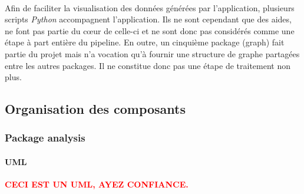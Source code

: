 \documentclass{scrartcl}
\begin{document}
    \paragraph{}Afin de faciliter la visualisation des données générées par l'application, plusieurs scripts \textit{Python} accompagnent l'application. Ils ne sont cependant que des aides, ne font pas partie du cœur de celle-ci et ne sont donc pas considérés comme une étape à part entière du pipeline. En outre, un cinquième package (graph) fait partie du projet mais n'a vocation qu'à fournir une structure de graphe partagées entre les autres packages. Il ne constitue donc pas une étape de traitement non plus.

\subsection{Organisation des composants}

\subsubsection{Package analysis}
    \paragraph{UML} \textbf{\textcolor{red}{CECI EST UN UML, AYEZ CONFIANCE.}}
    
\end{document}
